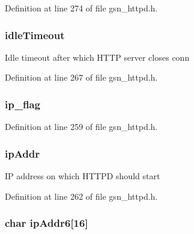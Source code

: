 Definition at line 274 of file gsn\_\-httpd.h.

\hypertarget{a00095_aac2c222f5ad72d02b349e797f5601c8b}{
\subsubsection[{idleTimeout}]{ {\bf idleTimeout}}}
\label{a00095_aac2c222f5ad72d02b349e797f5601c8b}
Idle timeout after which HTTP server closes conn 

Definition at line 267 of file gsn\_\-httpd.h.

\hypertarget{a00095_ad0126381cf1366366ff4b35d3a79b581}{
\subsubsection[{ip\_\-flag}]{ {\bf ip\_\-flag}}}
\label{a00095_ad0126381cf1366366ff4b35d3a79b581}


Definition at line 259 of file gsn\_\-httpd.h.

\hypertarget{a00095_a48e99cad0feadbd616a0cda7d9628826}{
\subsubsection[{ipAddr}]{ {\bf ipAddr}}}
\label{a00095_a48e99cad0feadbd616a0cda7d9628826}
IP address on which HTTPD should start 

Definition at line 262 of file gsn\_\-httpd.h.

\hypertarget{a00095_ac889b27347bab80192c6fb582870de1b}{
\subsubsection[{ipAddr6}]{\setlength{\rightskip}{0pt plus 5cm}char {\bf ipAddr6}\mbox{[}16\mbox{]}}}
\label{a00095_ac889b27347bab80192c6fb582870de1b}


